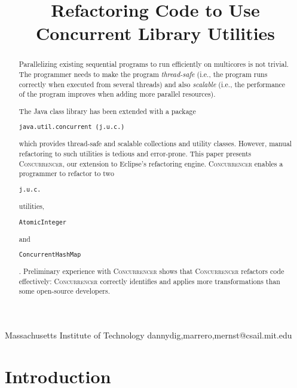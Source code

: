 \documentclass[10pt,preprint]{sigplanconf}
\newcommand\tool{{\smaller\textsc{Concurrencer}}\xspace}
\newcommand{\code}[1]{\begin{small}\texttt{#1}\end{small}}
\begin{document}


\title{Refactoring Code to Use Concurrent Library Utilities}

           {Massachusetts Institute of Technology}
           {dannydig,marrero,mernst@csail.mit.edu}

\maketitle
\thispagestyle{empty}

\begin{abstract}
Parallelizing existing sequential programs to run efficiently on multicores is
not trivial. The programmer needs to make the program \emph{thread-safe} (i.e.,
the program runs correctly when executed from several threads) and also \emph{scalable} (i.e., the performance of the program
improves when adding more parallel resources).

The Java class library has been extended with a package
\code{java.util.concurrent (j.u.c.)} which provides thread-safe and scalable
collections and utility classes. However, manual refactoring to such
utilities is tedious and error-prone. This paper presents \tool, our extension
to Eclipse's refactoring engine. \tool enables a programmer to refactor to 
two \code{j.u.c.} utilities, \code{AtomicInteger} and \code{ConcurrentHashMap}.
Preliminary experience with \tool shows that
\tool refactors code effectively: \tool correctly identifies and applies more
transformations than some open-source developers.

\end{abstract}


% 

\section{Introduction}

\end{document}
